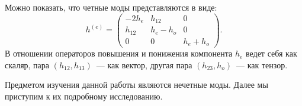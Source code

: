 \documentclass[\docroot/reports/draft/report.tex]{subfiles}
\begin{document}
    Можно показать, что четные моды представляются в виде:
    \begin{equation}
        h^{(e)} = \begin{pmatrix}-2h_e&h_{12}&0\\h_{12}&h_e-h_o&0\\0&0&h_e+h_o\end{pmatrix} .
    \end{equation}
    В отношении операторов повышения и понижения компонента $h_e$ ведет себя как скаляр, пара $(h_{12},h_{13})$~--- как вектор, другая пара $(h_{23},h_o)$~--- как тензор.

    Предметом изучения данной работы являются нечетные моды. Далее мы приступим к их подробному исследованию.


\end{document}
